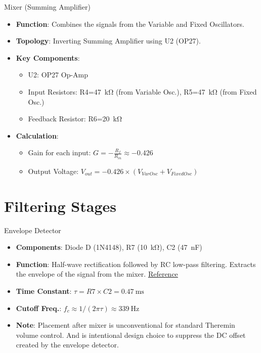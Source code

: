 \documentclass[10pt,xcolor={table,dvipsnames},t]{beamer}
\begin{document}
\begin{frame}{Mixer (Summing Amplifier)}
\begin{itemize}
    \item \textbf{Function}: Combines the signals from the Variable and Fixed Oscillators.
    \item \textbf{Topology}: Inverting Summing Amplifier using U2 (OP27).
    \item \textbf{Key Components}:
    \begin{itemize}
        \item U2: OP27 Op-Amp
        \item Input Resistors: R4=\SI{47}{\kilo\ohm} (from Variable Osc.), R5=\SI{47}{\kilo\ohm} (from Fixed Osc.)
        \item Feedback Resistor: R6=\SI{20}{\kilo\ohm}
    \end{itemize}
    \item \textbf{Calculation}:
    \begin{itemize}
        \item Gain for each input: $G = -\frac{R_f}{R_{in}} \approx -0.426$
        \item Output Voltage: $V_{out} = -0.426 \times (V_{VarOsc} + V_{FixedOsc})$
    \end{itemize}
\end{itemize}
\end{frame}

\section{Filtering Stages}

\begin{frame}{Envelope Detector}
\begin{itemize}
    \item \textbf{Components}: Diode D (1N4148), R7 (\SI{10}{\kilo\ohm}), C2 (\SI{47}{\nano\farad})
    \item \textbf{Function}: Half-wave rectification followed by RC low-pass filtering. Extracts the envelope of the signal from the mixer. \href{https://www.winlab.rutgers.edu/~crose/322_html/envelope_detector.html}{Reference}
    \item \textbf{Time Constant}: $\tau = R7 \times C2 = \SI{0.47}{\milli\second}$
    \item \textbf{Cutoff Freq.}: $f_c \approx 1/(2\pi\tau) \approx \SI{339}{\hertz}$
    \item \textbf{Note}: Placement after mixer is unconventional for standard Theremin volume control. And is intentional design choice to suppress the DC offset created by the envelope detector.
\end{itemize}

\end{frame}
\end{document}
